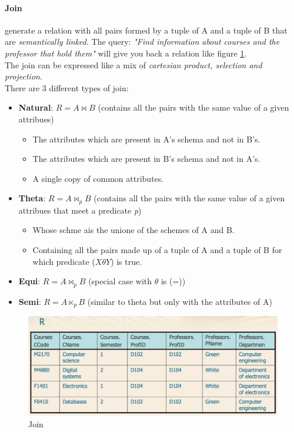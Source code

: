 \documentclass[12pt]{article}
\begin{document}
\paragraph{Join} generate a relation with all pairs formed by a tuple of A and a tuple of B that are \textit{semantically linked}. The query: \textit{"Find information about courses and the professor that hold them"} will give you back a relation like figure \ref{fig:join}.\\
The join can be expressed like a mix of \textit{cartesian product, selection and projection}.\\
There are 3 different types of join:
\begin{itemize}
  \item \textbf{Natural}: $R=A\bowtie B$ (contains all the pairs with the same value of a given attribues)
  \begin{itemize}
    \item The attributes which are present in A's schema and not in B's.
    \item The attributes which are present in B's schema and not in A's.
    \item A single copy of common attributes.
  \end{itemize}
  \item \textbf{Theta}: $R=A\bowtie_{p} B$ (contains all the pairs with the same value of a given attribues that meet a predicate \textit{p})
  \begin{itemize}
    \item Whose schme ais the unione of the schemes of A and B.
    \item Containing all the pairs made up of a tuple of A and a tuple of B for which predicate ($X \theta Y$) is true.
  \end{itemize}
  \item \textbf{Equi}: $R=A\bowtie_{p} B$ (special case with $\theta$ is (=))
  \item \textbf{Semi}: $R=A\ltimes_{p} B$ (similar to theta but only with the attributes of A)
\end{itemize}
\begin{figure}[H]
  \includegraphics[width=\textwidth]{images/join.png}
  \caption{Join}
  \label{fig:join}
\end{figure}
\end{document}

